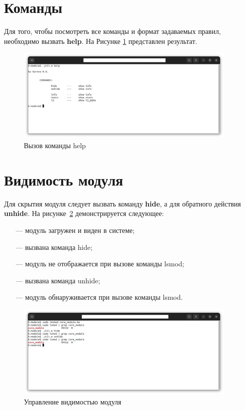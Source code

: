 \documentclass{bmstu}
\begin{document}
\section{Команды}
Для того, чтобы посмотреть все команды и формат задаваемых правил, необходимо вызвать \textbf{help}. На Рисунке \ref{img:help} представлен результат.

\begin{figure}[hbtp]
 \centering
 \includegraphics[width=0.95\textwidth]{inc/img/help.png}
 \caption{Вызов команды help}
 \label{img:help}
\end{figure}

\section{Видимость модуля}
Для скрытия модуля следует вызвать команду \textbf{hide}, а для обратного действия \textbf{unhide}. На рисунке~\ref{img:hide_unhide} демонстрируется следующее:

\begin{itemize}
\item[---] модуль загружен и виден в системе;
\item[---] вызвана команда hide;
\item[---] модуль не отображается при вызове команды lsmod;
\item[---] вызвана команда unhide;
\item[---] модуль обнаруживается при вызове команды lsmod.
\end{itemize}

\begin{figure}[hbtp]
 \centering
 \includegraphics[width=0.95\textwidth]{inc/img/hide_unhide.png}
 \caption{Управление видимостью модуля}
 \label{img:hide_unhide}
\end{figure}
\end{document}
